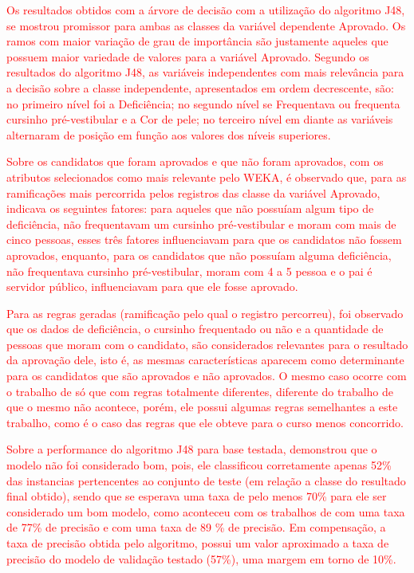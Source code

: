 \label{chapter:Conclusão}

\par
\textcolor{red}{Os resultados obtidos com a árvore de decisão com a utilização do algoritmo J48, se mostrou promissor para ambas as classes da variável dependente Aprovado. Os ramos com maior variação de grau de importância são justamente aqueles que possuem maior variedade de valores para a variável Aprovado. Segundo os resultados do algoritmo J48, as variáveis independentes com mais relevância para a decisão sobre a classe independente, apresentados em ordem decrescente, são: no primeiro nível foi a Deficiência; no segundo nível se Frequentava ou frequenta cursinho pré-vestibular e a Cor de pele; no terceiro nível em diante as variáveis alternaram de posição em função aos valores dos níveis superiores.}

\par
\textcolor{red}{Sobre os candidatos que foram aprovados e que não foram aprovados, com os atributos selecionados como mais relevante pelo WEKA, é observado que, para as ramificações mais percorrida pelos registros das classe da variável Aprovado, indicava os seguintes fatores: para aqueles que não possuíam algum tipo de deficiência, não frequentavam um cursinho pré-vestibular e moram com mais de cinco pessoas, esses três fatores influenciavam para que os candidatos não fossem aprovados, enquanto, para os candidatos que não possuíam alguma deficiência, não frequentava cursinho pré-vestibular, moram com 4 a 5 pessoa e o pai é servidor público, influenciavam para que ele fosse aprovado.}

\par
\textcolor{red}{Para as regras geradas (ramificação pelo qual o registro percorreu),  foi observado que os dados de deficiência, o cursinho frequentado ou não e a quantidade de pessoas que moram com o candidato, são considerados relevantes para o resultado da aprovação dele, isto é, as mesmas características aparecem como determinante para os candidatos que são aprovados e não aprovados.  O mesmo caso ocorre com o trabalho de  só que com regras totalmente diferentes, diferente do trabalho de  que o mesmo não acontece, porém, ele possui algumas regras semelhantes a este trabalho, como é o caso das regras que ele obteve para o curso menos concorrido.}


\par
\textcolor{red}{Sobre a performance do algoritmo J48 para base testada, demonstrou que o modelo não foi considerado bom, pois, ele classificou corretamente apenas 52\% das instancias pertencentes ao conjunto de teste (em relação a classe do resultado final obtido), sendo que se esperava uma taxa de pelo menos 70\% para ele ser considerado um bom modelo, como aconteceu com os trabalhos de   com uma taxa de 77\% de precisão e  com uma taxa de 89 \% de precisão. Em compensação, a taxa de precisão obtida pelo algoritmo, possui um valor aproximado a taxa de precisão do modelo de validação testado (57\%), uma margem em torno de 10\%.}